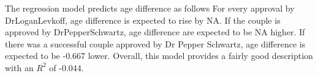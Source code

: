 



The regression model predicts age difference as follows 
For every approval by DrLoganLevkoff, age difference is expected 
to rise by NA. 
If the couple is approved by DrPepperSchwartz, age difference are expected 
to be NA higher. 
If there was a successful couple approved by Dr Pepper Schwartz, age difference is expected 
to be -0.667 lower. 
Overall, this model provides a fairly good description with an $R^2$ of -0.044.

